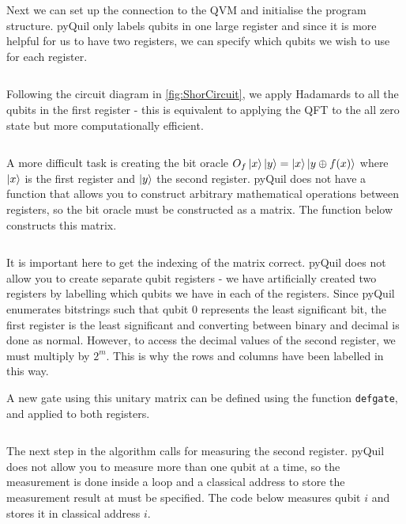 Next we can set up the connection to the QVM and initialise the program structure. pyQuil only labels qubits in one large register and since it is more helpful for us to have two registers, we can specify which qubits we wish to use for each register.

\inputminted[firstnumber=47, firstline=47, lastline=53]{python}{code/pyQuil/shor_pyquil_guide.txt}

Following the circuit diagram in \autoref{fig:ShorCircuit}, we apply Hadamards to all the qubits in the first register - this is equivalent to applying the QFT to the all zero state but more computationally efficient.

\inputminted[firstnumber=55, firstline=55, lastline=57]{python}{code/pyQuil/shor_pyquil_guide.txt}

A more difficult task is creating the bit oracle $O_f\left\vert{x}\right\rangle\left\vert{y}\right\rangle = \left\vert{x}\right\rangle\left\vert{y \oplus f(x)}\right\rangle$ where $\left\vert{x}\right\rangle $ is the first register and $\left\vert{y}\right\rangle$ the second register. pyQuil does not have a function that allows you to construct arbitrary mathematical operations between registers, so the bit oracle must be constructed as a matrix. The function below constructs this matrix. 

\inputminted[firstnumber=11, firstline=11, lastline=22]{python}{code/pyQuil/shor_pyquil_guide.txt}

It is important here to get the indexing of the matrix correct. pyQuil does not allow you to create separate qubit registers - we have artificially created two registers by labelling which qubits we have in each of the registers. Since pyQuil enumerates bitstrings such that qubit 0 represents the least significant bit, the first register is the least significant and converting between binary and decimal is done as normal. However, to access the decimal values of the second register, we must multiply by $2^m$. This is why the rows and columns have been labelled in this way. 

A new gate using this unitary matrix can be defined using the function \texttt{defgate}, and applied to both registers.

\inputminted[firstnumber=59, firstline=59, lastline=62]{python}{code/pyQuil/shor_pyquil_guide.txt}

The next step in the algorithm calls for measuring the second register. pyQuil does not allow you to measure more than one qubit at a time, so the measurement is done inside a loop and a classical address to store the measurement result at must be specified. The code below measures qubit $i$ and stores it in classical address $i$.

